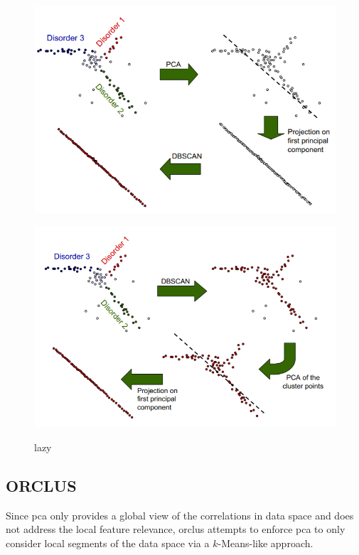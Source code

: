 \begin{figure}
    \centering
    \begin{minipage}[t]{.5\textwidth}
      \centering  
      \captionsetup{width=.9\linewidth}
      \includegraphics[width=.9\textwidth]{figures/pcalocalfeat1.png}
      \label{fig:pca_dbscan}
    \end{minipage}%
    \begin{minipage}[t]{.5\textwidth}
      \centering
      \captionsetup{width=.9\linewidth}
      \includegraphics[width=.9\textwidth]{figures/pcalocalfeat2.png}
      \label{fig:dbscan_pca}
    \end{minipage}
    \caption{lazy}
    \label{fig:localfeatrelevance}
\end{figure}

\subsection{ORCLUS}
Since \gls{pca} only provides a global view of the correlations in data space and does not address the local feature relevance, \gls{orclus} attempts to enforce \gls{pca} to only consider local segments of the data space via a $k$-Means-like approach. 

